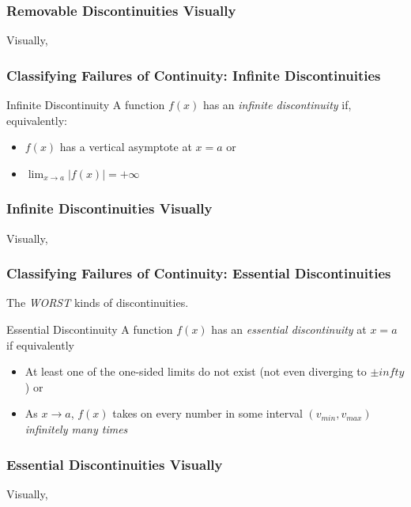 \documentclass{ltx-talk}
\begin{document}
\begin{frame}
  \frametitle{Removable Discontinuities Visually}
  Visually,
  \vfill
\end{frame}

\begin{frame}
  \frametitle{Classifying Failures of Continuity: Infinite Discontinuities}
  \begin{block}{Infinite Discontinuity}
    A function $f(x)$ has an \textit{infinite discontinuity} if, equivalently: \pause
    \begin{itemize}
      \item $f(x)$ has a vertical asymptote at $x = a$ or \pause
    \item $\lim_{x \rightarrow a} |f(x)| = + \infty$
    \end{itemize}
  \end{block}
\end{frame}

\begin{frame}
  \frametitle{Infinite Discontinuities Visually}
  Visually, 
  \vfill
\end{frame}

\begin{frame}
  \frametitle{Classifying Failures of Continuity: Essential Discontinuities}
  The \textit{WORST} kinds of discontinuities. \pause

  \begin{block}{Essential Discontinuity}
    A function $f(x)$ has an \textit{essential discontinuity} at $x = a$ if equivalently \pause
    \begin{itemize}
      \item At least one of the one-sided limits do not exist (not even diverging to $\pm infty$) or \pause
      \item As $x \rightarrow a$, $f(x)$ takes on every number in some interval $(v_{min}, v_{max})$ \textit{infinitely many times}
    \end{itemize}
  \end{block}
\end{frame}

\begin{frame}
  \frametitle{Essential Discontinuities Visually}
  Visually,
  \vfill
\end{frame}
\end{document}
